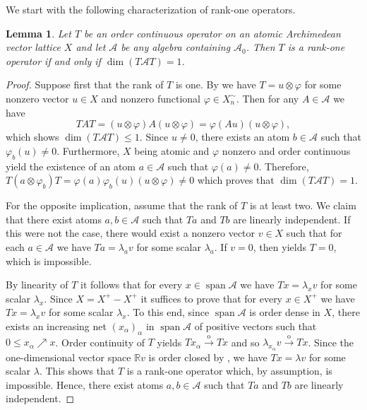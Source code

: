\documentclass[12pt,reqno]{amsart}
\theoremstyle{plain}
\newtheorem{lemma}[theorem]{Lemma}
\theoremstyle{definition}
\newcommand{\goeso}{\xrightarrow{\mathrm{o}}}	%
\DeclareMathOperator{\Span}{span}
\begin{document}
 
We start with the following characterization of rank-one operators. 

\begin{lemma}\label{dim=1 rkT=1}
Let $T$ be an order continuous operator on an atomic Archimedean vector lattice $X$ and let $\mathscr A$ be any algebra containing $\mathscr A_0$.
Then $T$ is a rank-one operator if and only if $\dim(T\mathscr A T)=1$. 
\end{lemma}

\begin{proof}
Suppose first that the rank of $T$ is one. By  we have $T=u\otimes \varphi$ for some nonzero vector $u\in X$ and nonzero functional $\varphi\in X_n^\sim$. Then for any $A\in \mathscr A$ we have
$$TAT=(u\otimes \varphi)A(u\otimes \varphi)=\varphi(Au)(u\otimes \varphi),$$
which shows $\dim(T\mathscr A T)\leq 1$.  Since $u\neq 0$, there exists an atom $b\in \mathcal A$ such that $\varphi_b(u)\neq 0$. Furthermore, $X$ being atomic and $\varphi$ nonzero and order continuous yield the existence of an atom $a\in \mathcal A$ such that $\varphi(a)\neq 0$. Therefore, 
$T(a\otimes \varphi_b)T=\varphi(a)\varphi_b(u)(u\otimes\varphi)\neq 0$ which proves that $\dim(T\mathscr A T)=1$.

For the opposite implication, assume that the rank of $T$ is at least two. We claim that there exist atoms $a, b\in\mathcal A$ such that $Ta$ and $Tb$ are linearly independent. If this were not the case, there would exist a nonzero vector $v\in X$ such that for each $a\in \mathcal A$ we have $Ta=\lambda_a v$ for some scalar $\lambda_a$. If $v=0$, then  yields $T=0$, which is impossible.

By linearity of $T$ it follows that for every $x\in \Span \mathcal A$ we have $Tx =\lambda_x v$ for some scalar $\lambda_x$. Since $X=X^+-X^+$ it suffices to prove that for every $x\in X^+$ we have $Tx=\lambda_xv$ for some scalar $\lambda_x$. To this end, since $\Span\mathcal A$ is order dense in $X$, there exists an increasing net $(x_\alpha)_\alpha$ in $\Span \mathcal A$ of positive vectors such that $0\leq x_\alpha\nearrow x$. Order continuity of $T$ yields $Tx_\alpha\goeso Tx$ and so $\lambda_{x_\alpha}v \goeso Tx$. Since the one-dimensional vector space $\mathbb Rv$ is order closed by , we have $Tx=\lambda v$ for some scalar $\lambda$. This shows that $T$ is a rank-one operator which, by assumption, is impossible.  Hence,
there exist atoms $a,b\in \mathcal A$ such that $Ta$ and $Tb$ are linearly independent. 


\end{proof}
\end{document}
